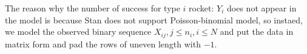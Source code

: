 \documentclass{article}
\begin{document}
The reason why the number of success for type $i$ rocket: $Y_i$ does not appear in the model is because Stan does not support Poisson-binomial model, so instaed, we model the observed binary sequence $X_{ij}, j \leq n_i, i \leq N$ and put the data in matrix form and pad the rows of uneven length with $-1$.
\end{document}
